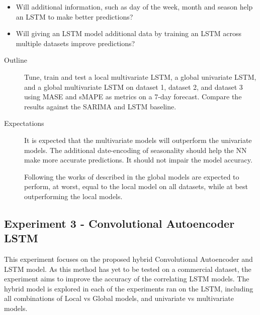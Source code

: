 \begin{itemize}
  \item {Will additional information, such as day of the week, month and season help an LSTM to make better predictions?}
  \item {Will giving an LSTM model additional data by training an LSTM across multiple datasets improve predictions?}
\end{itemize}

\begin{description}
  \item[Outline]{
              Tune, train and test a local multivariate LSTM, a global univariate LSTM,
              and a global multivariate LSTM on dataset 1,
              dataset 2, and dataset 3 using MASE and sMAPE as metrics on a 7-day forecast.
              Compare the results against the SARIMA and LSTM baseline.
        }
\end{description}

\begin{description}
  \item[Expectations]{
              It is expected that the multivariate models will outperform the univariate models.
              The additional date-encoding of seasonality should help the NN make more accurate predictions.
              It should not impair the model accuracy.

              Following the works of \cite{Montero-Manso2021} described in 
              the global models are expected to perform, at worst, equal to the local model on all datasets, while at best outperforming the local models.

        }
\end{description}

\subsection{Experiment 3 - Convolutional Autoencoder LSTM}
This experiment focuses on the proposed hybrid Convolutional Autoencoder and LSTM model.
As this method has yet to be tested on a commercial dataset,
the experiment aims to improve the accuracy of the correlating LSTM models.
The hybrid model is explored in each of the experiments ran on the LSTM,
including all combinations of Local vs Global models, and univariate vs multivariate models.

